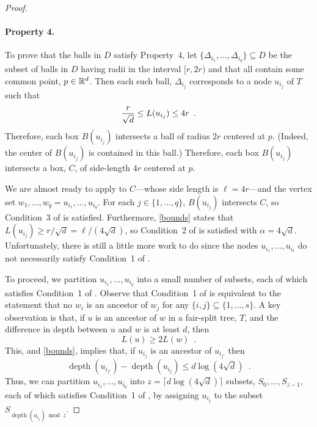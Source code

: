 \documentclass{patmorin}
\DeclareMathOperator{\depth}{depth}
\begin{document}
\begin{proof}
  \paragraph{Property 4.}
  To prove that the balls in $D$ satisfy Property~4, let
  $\{\Delta_{i_1},\ldots,\Delta_{i_q}\}\subseteq D$ be the subset of
  balls in $D$ having radii in the interval $[r,2r)$ and that all contain
  some common point, $p\in\mathbb{R}^d$.   Then each such ball, $\Delta_{i_j}$
  corresponds to a node $u_{i_j}$ of $T$ such that
  \begin{equation}
        \frac{r}{\sqrt{d}} \le L(u_{i_j}) \le 4r \enspace . \eqlabel{bounds}
  \end{equation}
  Therefore, each box $B(u_{i_j})$ intersects a ball of radius $2r$
  centered at $p$.  (Indeed, the center of $B(u_{i_j})$ is contained in
  this ball.)  Therefore, each box $B(u_{i_j})$ intersects a box, $C$, of
  side-length $4r$ centered at $p$.  

  We are almost ready to apply  to
  $C$---whose side length is $\ell = 4r$---and the vertex set
  $w_1,\ldots,w_q=u_{i_1},\ldots,u_{i_q}$. For each $j\in\{1,\ldots,q\}$,
  $B(u_{i_j})$ intersects $C$, so Condition~3 of 
  is satisfied.  Furthermore, \eqref{bounds} states that $L(u_{i_j})\ge
  r/\sqrt{d} = \ell/(4\sqrt{d})$, so Condition~2 of 
  is satisfied with $\alpha=4\sqrt{d}$.  Unfortunately, there is still
  a little more work to do since the nodes $u_{i_1},\ldots,u_{i_t}$
  do not necessarily satisfy Condition~1 of .

  To proceed, we partition $u_{i_1},\ldots,u_{i_q}$ into a small number of
  subsets, each of which satisfies Condition~1 of .
  Observe that Condition~1 of  is equivalent
  to the statement that no $w_i$ is an ancestor of $w_j$ for any
  $\{i,j\}\subseteq\{1,\ldots,s\}$.  A key observation is that, if $u$
  is an ancestor of $w$ in a fair-split tree, $T$, and the difference
  in depth between $u$ and $w$ is at least $d$, then
  \[
      L(u) \ge 2L(w) \enspace .
  \]
  This, and \eqref{bounds}, implies that, if $u_{i_j}$ is an ancestor
  of $u_{i_{j'}}$ then
  \[
     \depth(u_{i_{j'}})-\depth(u_{i_{j}}) \le d\log(4\sqrt{d}) \enspace .
  \]
  Thus, we can partition $u_{i_1},\ldots,u_{i_q}$ into $z=\lceil
  d\log(4\sqrt{d})\rceil$ subsets, $S_0,\ldots,S_{z-1}$, each of which
  satisfies Condition~1 of , by assigning $u_{i_j}$
  to the subset $S_{\depth(u_{i_j})\bmod z}$.  


\end{proof}
\end{document}
